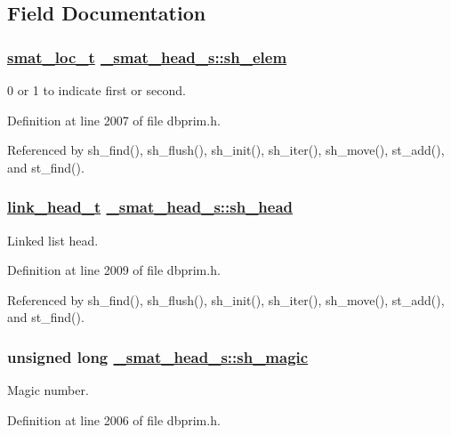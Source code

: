 \subsection{Field Documentation}
\hypertarget{struct__smat__head__s_o1}{
\subsubsection[sh\_\-elem]{\setlength{\rightskip}{0pt plus 5cm}\hyperlink{group__dbprim__smat_ga6}{smat\_\-loc\_\-t} \hyperlink{struct__smat__head__s_o1}{\_\-smat\_\-head\_\-s::sh\_\-elem}}}
\label{struct__smat__head__s_o1}


0 or 1 to indicate first or second. 

Definition at line 2007 of file dbprim.h.

Referenced by sh\_\-find(), sh\_\-flush(), sh\_\-init(), sh\_\-iter(), sh\_\-move(), st\_\-add(), and st\_\-find().\hypertarget{struct__smat__head__s_o3}{
\subsubsection[sh\_\-head]{\setlength{\rightskip}{0pt plus 5cm}\hyperlink{struct__link__head__s}{link\_\-head\_\-t} \hyperlink{struct__smat__head__s_o3}{\_\-smat\_\-head\_\-s::sh\_\-head}}}
\label{struct__smat__head__s_o3}


Linked list head. 

Definition at line 2009 of file dbprim.h.

Referenced by sh\_\-find(), sh\_\-flush(), sh\_\-init(), sh\_\-iter(), sh\_\-move(), st\_\-add(), and st\_\-find().\hypertarget{struct__smat__head__s_o0}{
\subsubsection[sh\_\-magic]{\setlength{\rightskip}{0pt plus 5cm}unsigned long \hyperlink{struct__smat__head__s_o0}{\_\-smat\_\-head\_\-s::sh\_\-magic}}}
\label{struct__smat__head__s_o0}


Magic number. 

Definition at line 2006 of file dbprim.h.

